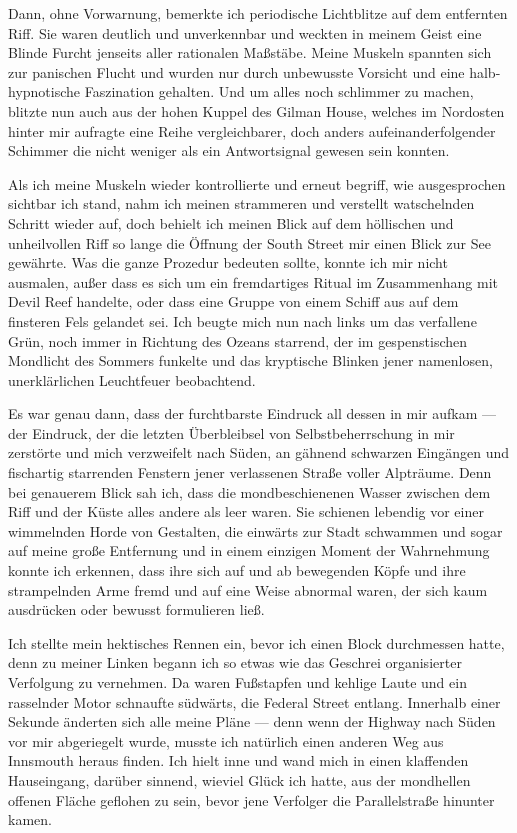 Dann, ohne Vorwarnung, bemerkte ich periodische Lichtblitze auf dem entfernten Riff. Sie waren deutlich und unverkennbar und weckten in meinem Geist eine Blinde Furcht jenseits aller rationalen Maßstäbe. Meine Muskeln spannten sich zur panischen Flucht und wurden nur durch unbewusste Vorsicht und eine halb-hypnotische Faszination gehalten. Und um alles noch schlimmer zu machen, blitzte nun auch aus der hohen Kuppel des Gilman House, welches im Nordosten hinter mir aufragte eine Reihe vergleichbarer, doch anders aufeinanderfolgender Schimmer die nicht weniger als ein Antwortsignal gewesen sein konnten.

Als ich meine Muskeln wieder kontrollierte und erneut begriff, wie ausgesprochen sichtbar ich stand, nahm ich meinen strammeren und verstellt watschelnden Schritt wieder auf, doch behielt ich meinen Blick auf dem höllischen und unheilvollen Riff so lange die Öffnung der South Street mir einen Blick zur See gewährte. Was die ganze Prozedur bedeuten sollte, konnte ich mir nicht ausmalen, außer dass es sich um ein fremdartiges Ritual im Zusammenhang mit Devil Reef handelte, oder dass eine Gruppe von einem Schiff aus auf dem finsteren Fels gelandet sei. Ich beugte mich nun nach links um das verfallene Grün, noch immer in Richtung des Ozeans starrend, der im gespenstischen Mondlicht des Sommers funkelte und das kryptische Blinken jener namenlosen, unerklärlichen Leuchtfeuer beobachtend.

Es war genau dann, dass der furchtbarste Eindruck all dessen in mir aufkam --- der Eindruck, der die letzten Überbleibsel von Selbstbeherrschung in mir zerstörte und mich verzweifelt nach Süden, an gähnend schwarzen Eingängen und fischartig starrenden Fenstern jener verlassenen Straße voller Alpträume. Denn bei genauerem Blick sah ich, dass die mondbeschienenen Wasser zwischen dem Riff und der Küste alles andere als leer waren. Sie schienen lebendig vor einer wimmelnden Horde von Gestalten, die einwärts zur Stadt schwammen und sogar auf meine große Entfernung und in einem einzigen Moment der Wahrnehmung konnte ich erkennen, dass ihre sich auf und ab bewegenden Köpfe und ihre strampelnden Arme fremd und auf eine Weise abnormal waren, der sich kaum ausdrücken oder bewusst formulieren ließ.

Ich stellte mein hektisches Rennen ein, bevor ich einen Block durchmessen hatte, denn zu meiner Linken begann ich so etwas wie das Geschrei organisierter Verfolgung zu vernehmen. Da waren Fußstapfen und kehlige Laute und ein rasselnder Motor schnaufte südwärts, die Federal Street entlang. Innerhalb einer Sekunde änderten sich alle meine Pläne --- denn wenn der Highway nach Süden vor mir abgeriegelt wurde, musste ich natürlich einen anderen Weg aus Innsmouth heraus finden. Ich hielt inne und wand mich in einen klaffenden Hauseingang, darüber sinnend, wieviel Glück ich hatte, aus der mondhellen offenen Fläche geflohen zu sein, bevor jene Verfolger die Parallelstraße hinunter kamen.


